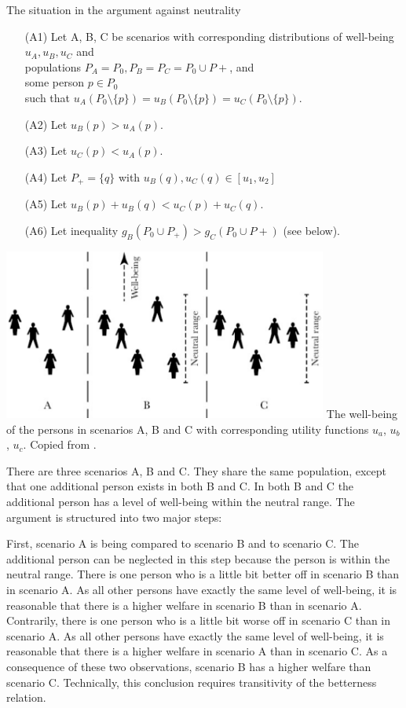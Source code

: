 \begin{Counterexample}{The situation in the argument against neutrality}{}
\begin{enumerate}
\item[(A1)]
Let A, B, C be scenarios with  
corresponding distributions of well-being $u_A, u_B, u_C$ and \\
populations $P_A = P_0, P_B = P_C = P_0 \cup P+$, and \\
some person $p \in P_0$ \\
such that $u_A(P_0 \setminus \{p\}) = u_B(P_0 \setminus \{p\}) = u_C(P_0 \setminus \{p\}).$
\item[(A2)] Let $u_B(p) > u_A(p).$
\item[(A3)] Let $u_C(p) < u_A(p).$
\item[(A4)] Let $P_+ = \{q\}$ with $u_B(q), u_C(q) \in [u_1, u_2]$
\item[(A5)] Let $u_B(p) + u_B(q) < u_C(p) + u_C(q).$
\item[(A6)] Let inequality $g_B(P_0 \cup P_+) > g_C(P_0 \cup P+)$ (see below). 
\end{enumerate}
\begin{center}
  \includegraphics[width=0.8\textwidth]{3-fig-1}
  \scriptsize The well-being of the persons in scenarios A, B and C with corresponding utility functions $u_a$, $u_b$, $u_c$. Copied from .
\end{center}
\end{Counterexample}

There are three scenarios A, B and C. They share the same population, except that one additional person exists in both B and C. In both B and C the additional person has a level of well-being within the neutral range. The argument is structured into two major steps:  

First, scenario A is being compared to scenario B and to scenario C. The additional person can be neglected in this step because the person is within the neutral range. There is one person who is a little bit better off in scenario B than in scenario A. As all other persons have exactly the same level of well-being, it is reasonable that there is a higher welfare in scenario B than in scenario A. Contrarily, there is one person who is a little bit worse off in scenario C than in scenario A. As all other persons have exactly the same level of well-being, it is reasonable that there is a higher welfare in scenario A than in scenario C. As a consequence of these two observations, scenario B has a higher welfare than scenario C. Technically, this conclusion requires transitivity of the betterness relation.  

